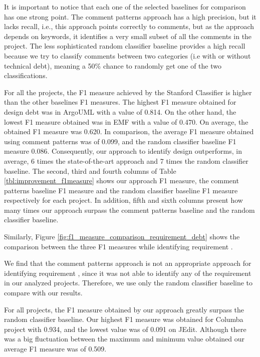 It is important to notice that each one of the selected baselines for comparison has one strong point. The comment patterns approach has a high precision, but it lacks recall, i.e., this approach points correctly to \SATD comments, but as the approach depends on keywords, it identifies a very small subset of all the \SATD comments in the project. The less sophisticated random classifier baseline provides a high recall because we try to classify comments between two categories (i.e with or without technical debt), meaning a 50\% chance to randomly get one of the two classifications. 

For all the projects, the F1 measure achieved by the Stanford Classifier is higher than the other baselines F1 measures. The highest F1 measure obtained for design debt was in ArgoUML with a value of 0.814. On the other hand, the lowest F1 measure obtained was in EMF with a value of 0.470. On average, the obtained F1 measure was 0.620. In comparison, the average F1 measure obtained using comment patterns was of 0.099, and the random classifier baseline F1 measure 0.086. Consequently, our approach to identify design \SATD outperforms, in average, 6 times the state-of-the-art approach and 7 times the random classifier baseline. 
The second, third and fourth columns of Table \ref{tbl:improvement_f1measure} shows our approach F1 measure, the comment patterns baseline F1 measure and the random classifier baseline F1 measure respectively for each project. In addition, fifth and sixth columns present how many times our approach surpass the comment patterns baseline and the random classifier baseline.   
 
Similarly, Figure \ref{fig:f1_measure_comparison_requirement_debt} shows the comparison between the three F1 measures while identifying requirement \SATD.

We find that the comment patterns approach is not an appropriate approach for identifying requirement \SATD, since it was not able to identify any of the requirement \SATD in our analyzed projects. Therefore, we use only the random classifier baseline to compare with our results.

For all projects, the F1 measure obtained by our approach greatly surpass the random classifier baseline. Our highest F1 measure was obtained for Columba project with 0.934, and the lowest value was of 0.091 on JEdit. Although there was a big fluctuation between the maximum and minimum value obtained our average F1 measure was of 0.509. 

